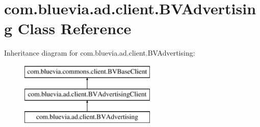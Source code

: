 \hypertarget{classcom_1_1bluevia_1_1ad_1_1client_1_1BVAdvertising}{
\section{com.bluevia.ad.client.BVAdvertising Class Reference}
\label{classcom_1_1bluevia_1_1ad_1_1client_1_1BVAdvertising}
}
Inheritance diagram for com.bluevia.ad.client.BVAdvertising:\begin{figure}[H]
\begin{center}
\leavevmode
\includegraphics[height=3.000000cm]{classcom_1_1bluevia_1_1ad_1_1client_1_1BVAdvertising}
\end{center}
\end{figure}
